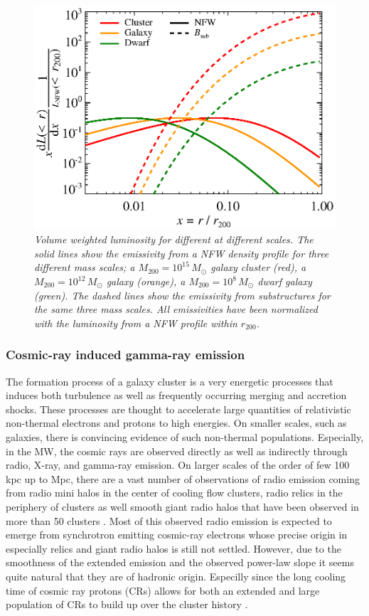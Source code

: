 \documentclass[10pt,aps,pra,reprint,amsmath,amsfonts,amssymb,showpacs]{revtex4-1}
\newcommand{\msun}{{M_\odot}}
\newcommand{\rvir}{r_{200}}
\newcommand{\mvir}{M_{200}}
\begin{document}
\begin{figure}
  \includegraphics[width=0.99\columnwidth]{figures/emissiv.sub.eps}
  \caption{\it Volume weighted luminosity for different at different
    scales. The solid lines show the emissivity from a NFW density
    profile for three different mass scales; a $\mvir=10^{15}\,\msun$
    galaxy cluster (red), a $\mvir=10^{12}\,\msun$ galaxy (orange), a
    $\mvir=10^{8}\,\msun$ dwarf galaxy (green). The dashed lines show
    the emissivity from substructures for the same three mass
    scales. All emissivities have been normalized with the luminosity
    from a NFW profile within $\rvir$.}
  \label{fig2}
\end{figure}

\subsubsection{Cosmic-ray induced gamma-ray emission}
\label{sect:CRs}
The formation process of a galaxy cluster is a very energetic
processes that induces both turbulence as well as frequently occurring
merging and accretion shocks. These processes are thought to
accelerate large quantities of relativistic non-thermal electrons and
protons to high energies. On smaller scales, such as galaxies, there
is convincing evidence of such non-thermal populations. Especially, in
the MW, the cosmic rays are observed directly as well as indirectly
through radio, X-ray, and gamma-ray emission. On larger scales of the
order of few 100 kpc up to Mpc, there are a vast number of
observations of radio emission coming from radio mini halos in the
center of cooling flow clusters, radio relics in the periphery of
clusters \cite{2004rcfg.proc..335K} as well smooth giant radio halos
that have been observed in more than 50 clusters
\cite{2003ASPC..301..143F,2008SSRv..134...93F}. Most of this observed
radio emission is expected to emerge from synchrotron emitting
cosmic-ray electrons whose precise origin in especially relics and
giant radio halos is still not settled. However, due to the smoothness
of the extended emission and the observed power-law slope it seems
quite natural that they are of hadronic origin. Especilly since the
long cooling time of cosmic ray protons (CRs) allows for both an
extended and large population of CRs to build up over the cluster
history \cite{1997ApJ...487..529B}.
\end{document}
